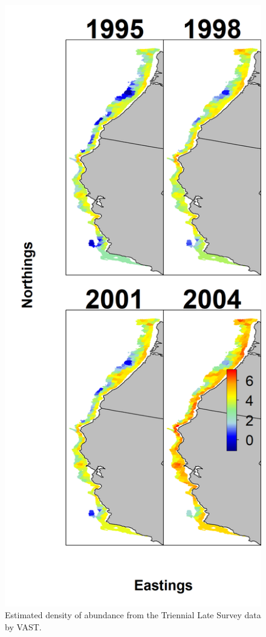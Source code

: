 \documentclass[12pt,]{article}
\begin{document}
\FloatBarrier

\begin{figure}
\centering
\includegraphics{Figures/tri_late_dens.png}
\caption{Estimated density of abundance from the Triennial Late Survey
data by VAST. \label{fig:tri_late_density}}
\end{figure}
\end{document}
